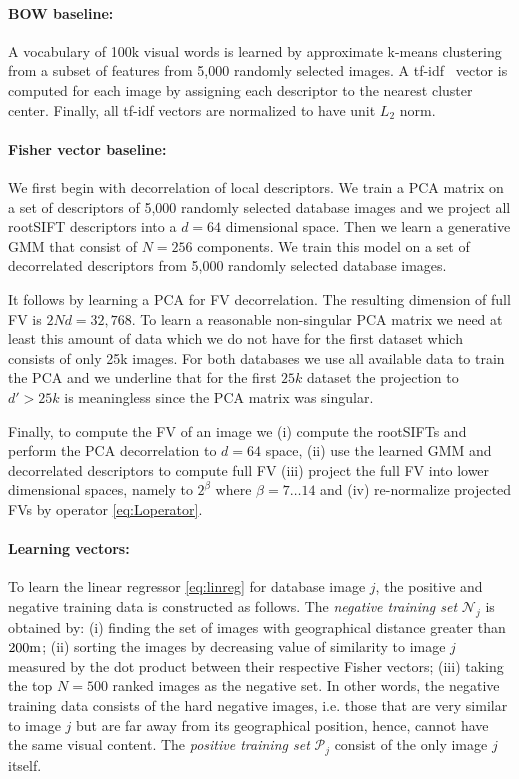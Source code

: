 \documentclass[table]{article} %
\begin{document}
	    \vspace{-4mm}
	   	\paragraph{BOW baseline:}	
	    	A vocabulary of 100k visual words is learned by approximate k-means clustering~\cite{Philbin07} from a subset of features from 5,000 randomly selected images. A tf-idf~\cite{Sivic2003} vector is computed for each image by assigning each descriptor to the nearest cluster center.  Finally, all tf-idf vectors are normalized to have unit $L_2$ norm.

	    \vspace{-4mm}
	    \paragraph{Fisher vector baseline:}
	    	We first begin with decorrelation of local descriptors. We train a PCA matrix on a set of descriptors of 5,000 randomly selected database images and we project all rootSIFT descriptors into a $d=64$ dimensional space. Then we learn a generative GMM that consist of $N=256$ components. We train this model on a set of decorrelated descriptors from 5,000 randomly selected database images.

	    	It follows by learning a PCA for FV decorrelation. The resulting dimension of full FV is $2Nd=32,768$. To learn a reasonable non-singular PCA matrix we need at least this amount of data which we do not have for the first dataset which consists of only 25k images. For both databases we use all available data to train the PCA and we underline that for the first $25k$ dataset the projection to $d'>25k$ is meaningless since the PCA matrix was singular.

	    	Finally, to compute the FV of an image we (i) compute the rootSIFTs and perform the PCA decorrelation to $d=64$ space, (ii) use the learned GMM and decorrelated descriptors to compute full FV (iii) project the full FV into lower dimensional spaces, namely to $2^\beta$ where $\beta=7\dots 14$ and (iv) re-normalize projected FVs by operator \eqref{eq:Loperator}.

	    \vspace{-4mm}
	    \paragraph{Learning vectors:}
			To learn the linear regressor \eqref{eq:linreg} for database image $j$, the positive and negative training data is constructed as follows. 
			The \emph{negative training set} $\mathcal N_j$ is obtained by: (i) finding the set of images with geographical distance greater than $200{\rm m}$; (ii)  sorting the images by decreasing value of similarity to image $j$ measured by the dot product between their respective Fisher vectors; (iii) taking the top $N=500$ ranked images as the negative set. 
			In other words, the negative training data consists of the hard negative images, i.e. those that are very similar to image $j$ but are far away from its geographical position, hence, cannot have the same visual content. The \emph{positive training set} $\mathcal P_j$ consist of the only image $j$ itself.
\end{document}
